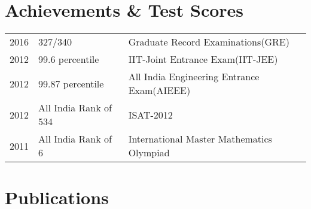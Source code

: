 \documentclass[]{resume}
\begin{document}
\begin{minipage}[t]{0.66\textwidth}
\section{Achievements \& Test Scores} 
\begin{tabular}{rll}
2016         & 327/340 & Graduate Record Examinations(GRE)\\
2012	     & 99.6 percentile  & IIT-Joint Entrance Exam(IIT-JEE)\\
2012	     & 99.87 percentile  & All India Engineering Entrance Exam(AIEEE)\\
2012	     & All India Rank of 534  & ISAT-2012\\
2011     & All India Rank of 6 & International Master Mathematics Olympiad\\
\end{tabular}
\sectionsep


\section{Publications}
\vspace{\topsep}
\vspace{\topsep}


\nocite{*}
\sectionsep

\end{minipage} 
\end{document}
